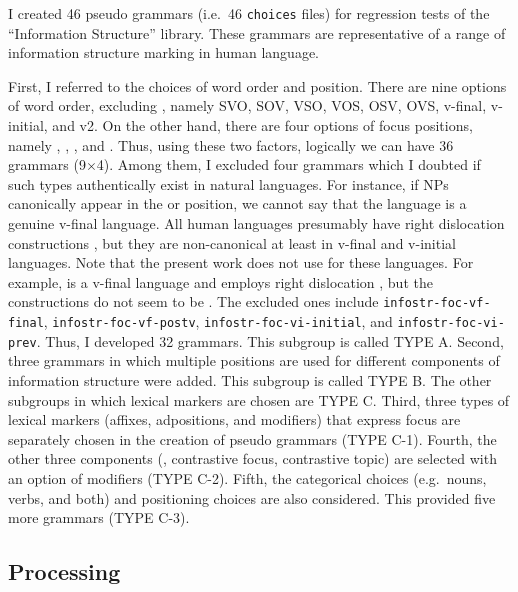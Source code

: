 I created 46 pseudo grammars (i.e.\ 46 \texttt{choices} files) for regression
tests of the ``Information Structure'' library.
These grammars are representative of a range of information structure
marking in human language.



First, I referred to the choices of word order and 
position. There are nine options of word order, excluding , namely SVO, SOV, VSO, VOS, OSV, OVS, v-final,
v-initial, and v2. On the other hand, there are four options of focus
positions, namely , ,
, and . Thus, using these two factors,
logically we can have 36 grammars (9\ensuremath{\times}4). Among
them, I excluded four grammars which I doubted if such types
authentically exist in natural languages. For instance, if NPs
canonically appear in the  or 
position, we cannot say that the language is a genuine v-final
language. All human languages presumably have right dislocation
constructions \citep{lambrecht:96}, but they are non-canonical at
least in v-final and v-initial languages. Note that the present work
does not use  for these languages.  For
example,  is a v-final language and employs right
dislocation \citep{kim:11}, but the constructions do not seem to be
. The excluded ones include
\texttt{infostr-foc-vf-final}, \texttt{infostr-foc-vf-postv},
\texttt{infostr-foc-vi-initial}, and \texttt{infostr-foc-vi-prev}.
Thus, I developed 32 grammars. This subgroup is called TYPE A.
Second, three grammars in which multiple positions are used for
different components of information structure were added.  This
subgroup is called TYPE B.  The other subgroups in which lexical
markers are chosen are TYPE C. Third, three types
of lexical markers (affixes, adpositions, and modifiers) that express
focus are separately chosen in the creation of pseudo grammars (TYPE
C-1). Fourth, the other three components (,
contrastive focus, contrastive topic) are selected with an option of
modifiers (TYPE C-2).  Fifth, the categorical choices (e.g.\ nouns,
verbs, and both) and positioning choices are also considered. This
provided five more grammars (TYPE C-3).


\subsection{Processing}
\label{12:ssec:testing}

